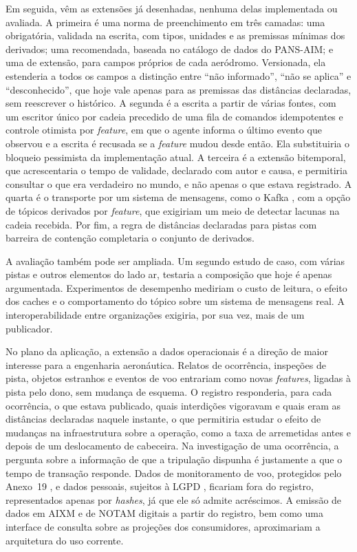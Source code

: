 Em seguida, vêm as extensões já desenhadas, nenhuma delas implementada ou avaliada. A primeira é uma norma de preenchimento em três camadas: uma obrigatória, validada na escrita, com tipos, unidades e as premissas mínimas dos derivados; uma recomendada, baseada no catálogo de dados do PANS-AIM; e uma de extensão, para campos próprios de cada aeródromo. Versionada, ela estenderia a todos os campos a distinção entre ``não informado'', ``não se aplica'' e ``desconhecido'', que hoje vale apenas para as premissas das distâncias declaradas, sem reescrever o histórico. A segunda é a escrita a partir de várias fontes, com um escritor único por cadeia precedido de uma fila de comandos idempotentes e controle otimista por \textit{feature}, em que o agente informa o último evento que observou e a escrita é recusada se a \textit{feature} mudou desde então. Ela substituiria o bloqueio pessimista da implementação atual. A terceira é a extensão bitemporal, que acrescentaria o tempo de validade, declarado com autor e causa, e permitiria consultar o que era verdadeiro no mundo, e não apenas o que estava registrado. A quarta é o transporte por um sistema de mensagens, como o Kafka \cite{kreps2011kafka}, com a opção de tópicos derivados por \textit{feature}, que exigiriam um meio de detectar lacunas na cadeia recebida. Por fim, a regra de distâncias declaradas para pistas com barreira de contenção completaria o conjunto de derivados.

A avaliação também pode ser ampliada. Um segundo estudo de caso, com várias pistas e outros elementos do lado ar, testaria a composição que hoje é apenas argumentada. Experimentos de desempenho mediriam o custo de leitura, o efeito dos caches e o comportamento do tópico sobre um sistema de mensagens real. A interoperabilidade entre organizações exigiria, por sua vez, mais de um publicador.

No plano da aplicação, a extensão a dados operacionais é a direção de maior interesse para a engenharia aeronáutica. Relatos de ocorrência, inspeções de pista, objetos estranhos e eventos de voo entrariam como novas \textit{features}, ligadas à pista pelo dono, sem mudança de esquema. O registro responderia, para cada ocorrência, o que estava publicado, quais interdições vigoravam e quais eram as distâncias declaradas naquele instante, o que permitiria estudar o efeito de mudanças na infraestrutura sobre a operação, como a taxa de arremetidas antes e depois de um deslocamento de cabeceira. Na investigação de uma ocorrência, a pergunta sobre a informação de que a tripulação dispunha é justamente a que o tempo de transação responde. Dados de monitoramento de voo, protegidos pelo Anexo~19 \cite{icaoanexo19}, e dados pessoais, sujeitos à LGPD \cite{lgpd2018}, ficariam fora do registro, representados apenas por \textit{hashes}, já que ele só admite acréscimos. A emissão de dados em AIXM e de NOTAM digitais a partir do registro, bem como uma interface de consulta sobre as projeções dos consumidores, aproximariam a arquitetura do uso corrente.

